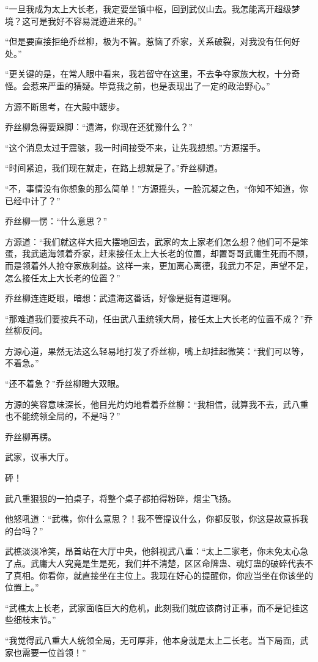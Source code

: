\begin{this_body}
“一旦我成为太上大长老，我定要坐镇中枢，回到武仪山去。我怎能离开超级梦境？这可是我好不容易混迹进来的。”

“但是要直接拒绝乔丝柳，极为不智。惹恼了乔家，关系破裂，对我没有任何好处。”

“更关键的是，在常人眼中看来，我若留守在这里，不去争夺家族大权，十分奇怪。会惹来严重的猜疑。毕竟我之前，也是表现出了一定的政治野心。”

方源不断思考，在大殿中踱步。

乔丝柳急得要跺脚：“遗海，你现在还犹豫什么？”

“这个消息太过于震骇，我一时间接受不来，让先我想想。”方源摆手。

“时间紧迫，我们现在就走，在路上想就是了。”乔丝柳道。

“不，事情没有你想象的那么简单！”方源摇头，一脸沉凝之色，“你知不知道，你已经中计了？”

乔丝柳一愣：“什么意思？”

方源道：“我们就这样大摇大摆地回去，武家的太上家老们怎么想？他们可不是笨蛋，我武遗海领着乔家，赶来接任太上大长老的位置，却置哥哥武庸生死而不顾，而是领着外人抢夺家族利益。这样一来，更加离心离德，我武力不足，声望不足，怎么接任太上大长老的位置？”

乔丝柳连连眨眼，暗想：武遗海这番话，好像是挺有道理啊。

“那难道我们要按兵不动，任由武八重统领大局，接任太上大长老的位置不成？”乔丝柳反问。

方源心道，果然无法这么轻易地打发了乔丝柳，嘴上却挂起微笑：“我们可以等，不着急。”

“还不着急？”乔丝柳瞪大双眼。

方源的笑容意味深长，他目光灼灼地看着乔丝柳：“我相信，就算我不去，武八重也不能统领全局的，不是吗？”

乔丝柳再楞。

武家，议事大厅。

砰！

武八重狠狠的一拍桌子，将整个桌子都拍得粉碎，烟尘飞扬。

他怒吼道：“武樵，你什么意思？！我不管提议什么，你都反驳，你这是故意拆我的台吗？”

武樵淡淡冷笑，昂首站在大厅中央，他斜视武八重：“太上二家老，你未免太心急了点。武庸大人究竟是生是死，我们并不清楚，区区命牌蛊、魂灯蛊的破碎代表不了真相。你看你，就直接坐在主位上。我现在好心的提醒你，你应当坐在你该坐的位置上。”

“武樵太上长老，武家面临巨大的危机，此刻我们就应该商讨正事，而不是记挂这些细枝末节。”

“我觉得武八重大人统领全局，无可厚非，他本身就是太上二长老。当下局面，武家也需要一位首领！”


\end{this_body}
